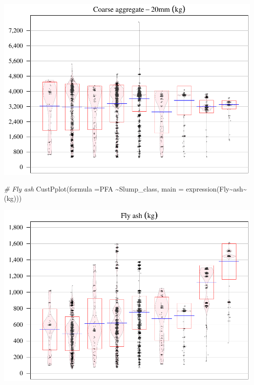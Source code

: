 \documentclass[
]{article}
\newenvironment{Shaded}{\begin{snugshade}}{\end{snugshade}}
\newcommand{\AttributeTok}[1]{\textcolor[rgb]{0.77,0.63,0.00}{#1}}
\newcommand{\CommentTok}[1]{\textcolor[rgb]{0.56,0.35,0.01}{\textit{#1}}}
\newcommand{\FunctionTok}[1]{\textcolor[rgb]{0.00,0.00,0.00}{#1}}
\newcommand{\NormalTok}[1]{#1}
\newcommand{\SpecialCharTok}[1]{\textcolor[rgb]{0.00,0.00,0.00}{#1}}
\begin{document}
\begin{center}\includegraphics{sl-inf-cairs-2301_files/figure-latex/dataInsights-6} \end{center}

\begin{Shaded}
\begin{Highlighting}[]
\CommentTok{\# Fly ash}
\FunctionTok{CustPplot}\NormalTok{(}\AttributeTok{formula =}\NormalTok{PFA }\SpecialCharTok{\textasciitilde{}}\NormalTok{Slump\_class, }\AttributeTok{main =} \FunctionTok{expression}\NormalTok{(Fly}\SpecialCharTok{\textasciitilde{}}\NormalTok{ash}\SpecialCharTok{\textasciitilde{}}\NormalTok{(kg)))}
\end{Highlighting}
\end{Shaded}

\begin{center}\includegraphics{sl-inf-cairs-2301_files/figure-latex/dataInsights-7} \end{center}
\end{document}
